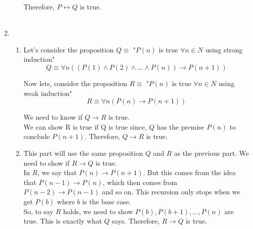 \documentclass[a4paper]{article}
\begin{document}
\begin{enumerate}
\begin{enumerate}
        Therefore, $P \leftrightarrow Q$ is true. \\ \\
        \end{enumerate}
    
    \item \begin{enumerate}
        \item Let's consider the proposition $Q \equiv$ "$P(n)$ is true $\forall n \in N$ using strong induction"
        \[ Q \equiv \forall n ((P(1) \land P(2) \land \dots \land P(n)) \rightarrow P(n+1)) \]

        Now lets, consider the proposition $R \equiv$ "$P(n)$ is true $\forall n \in N$ using weak induction"
        \[ R \equiv \forall n (P(n) \rightarrow P(n+1)) \]

        We need to know if $Q \rightarrow R$ is true. \\
        
        We can show R is true if Q is true since, $Q$ has the premise $P(n)$ to conclude $P(n+1)$. Therefore, $Q \rightarrow R$ is true. \\

        \item This part will use the same proposition $Q$ and $R$ as the previous part. We need to show if $R \rightarrow Q$ is true. \\

        In $R$, we say that $P(n) \rightarrow P(n+1)$. But this comes from the idea that $P(n-1) \rightarrow P(n)$, which then comes from $P(n-2) \rightarrow P(n-1)$ and so on. This recursion only stops when we get $P(b)$ where $b$ is the base case. \\

        So, to say $R$ holds, we need to show $P(b), P(b+1), \dots, P(n)$ are true. This is exactly what $Q$ says. Therefore, $R \rightarrow Q$ is true. \\


\end{enumerate}
\end{enumerate}
\end{document}
